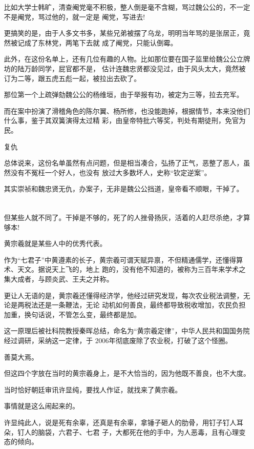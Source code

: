 \documentclass[11pt,a4paper,onecolumn]{article}
\begin{document}
比如大学士韩旷，清查阉党毫不积极，整人倒是毫不含糊，骂过魏公公的，不一定不是阉党，骂过他的，就一定是
阉党，写进去!

更搞笑的是，由于人多文书多，某些兄弟被摆了乌龙，明明当年骂的是张居正，竟然被记成了东林党，两笔下去就
成了阉党，只能认倒霉。

此外，在这份名单上，还有几位有趣的人物。比如那位要在国子监里给魏公公立牌坊的陆万龄同学，屁官都不是，
估计连魏忠贤都没见过，由于风头太大，竟然被订为二等，跟五虎五彪一起，被拉出去砍了。

那位第一个上疏弹劾魏公公的杨维垣，由于举报有功，被定为三等，拉去充军。

而在案中扮演了滑稽角色的陈尔翼、杨所修，也没能跑掉，根据情节，本来没他们什么事，鉴于其双簧演得太过精
彩，由皇帝特批六等奖，判处有期徒刑，免官为民。

复仇

总体说来，这份名单虽然有点问题，但是相当凑合，弘扬了正气，恶整了恶人，虽然没有不冤枉一个好人，也没有
放过大多数坏人，史称``钦定逆案''。

其实崇祯和魏忠贤无仇，办案子，无非是魏公公挡道，皇帝看不顺眼，干掉了。

\section[\thesection]{}

但某些人就不同了。干掉是不够的，死了的人挫骨扬灰，活着的人赶尽杀绝，才算够本!

黄宗羲就是某些人中的优秀代表。

作为``七君子''中黄遵素的长子，黄宗羲可谓天赋异禀，不但精通儒学，还懂得算术、天文。据说天上飞的，地上
跑的，没有他不知道的，被称为三百年来学术之集大成者，与顾炎武、王夫之并称。

更让人无语的是，黄宗羲还懂得经济学，他经过研究发现，每次农业税法调整，无论是两税法还是一条鞭法，无论
动机如何善良，最终都导致税收增加，农民负担加重，换句话说，不管怎么变，最终都是加。

这一原理后被社科院教授秦晖总结，命名为``黄宗羲定律''，中华人民共和国国务院经过调研，采纳这一定律，于
2006年彻底废除了农业税，打破了这个怪圈。

善莫大焉。

但这四个字放在当时的黄宗羲身上，是不大恰当的，因为他既不善良，也不大度。

当时恰好朝廷审讯许显纯，要找人作证，就找来了黄宗羲。

事情就是这么闹起来的。

许显纯此人，说是死有余辜，还真是有余辜，拿锤子砸人的肋骨，用钉子钉人耳朵，钉人的脑袋，六君子、七君
子，大都死在他的手中，为人恶毒，且有心理变态的倾向。
\end{document}
